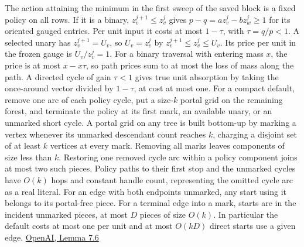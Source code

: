 \documentclass[11pt]{article}
\begin{document}
The action attaining the minimum in the first sweep of the saved block is a fixed policy on all rows. If it is a binary, \(z^{j+1}_v\le z^j_v\) gives \(p-q=a z_v^j-b z_w^j\ge1\) for its oriented gauged entries. Per unit input it costs at most \(1-\tau\), with \(\tau=q/p<1\). A selected unary has \(z^{j+1}_v=U_v\), so \(U_v=z^j_v\) by \(z_v^{j+1}\le z_v^j\le U_v\). Its price per unit in the frozen gauge is \(U_v/z^j_v=1\). For a binary traversal with entering mass \(x\), the price is at most \(x-x\tau\), so path prices sum to at most the loss of mass along the path. A directed cycle of gain \(\tau<1\) gives true unit absorption by taking the once-around vector divided by \(1-\tau\), at cost at most one. For a compact default, remove one arc of each policy cycle, put a size-\(k\) portal grid on the remaining forest, and terminate the policy at its first mark, an available unary, or an unmarked short cycle. A portal grid on any tree is built bottom-up by marking a vertex whenever its unmarked descendant count reaches \(k\), charging a disjoint set of at least \(k\) vertices at every mark. Removing all marks leaves components of size less than \(k\). Restoring one removed cycle arc within a policy component joins at most two such pieces. Policy paths to their first stop and the unmarked cycles have \(O(k)\) hops and constant handle count, representing the omitted cycle arc as a real literal. For an edge with both endpoints unmarked, any start using it belongs to its portal-free piece. For a terminal edge into a mark, starts are in the incident unmarked pieces, at most \(D\) pieces of size \(O(k)\). In particular the default costs at most one per unit and at most \(O(kD)\) direct starts use a given edge. \href{https://raw.githubusercontent.com/openai/math/adc7f1241b42e322a6451854ab7e4b4c146bf78a/preprints/Almost-Linear-Time-Maximum-Cardinality-Matching-in-Sparse-General-Graphs-September-24-2026/main.pdf\#page=58}{OpenAI, Lemma 7.6}
\end{document}
